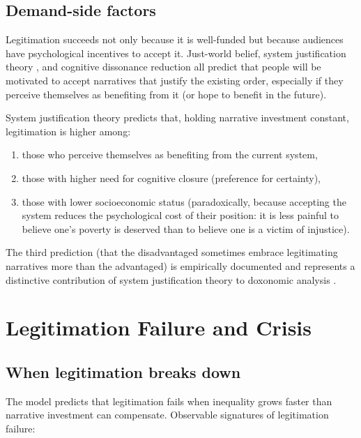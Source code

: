 \subsection{Demand-side factors}

Legitimation succeeds not only because it is well-funded but because audiences have psychological incentives to accept it.
Just-world belief, system justification theory \autocite{jost2004}, and cognitive dissonance reduction all predict that people will be motivated to accept narratives that justify the existing order, especially if they perceive themselves as benefiting from it (or hope to benefit in the future).

\begin{proposition}
\label{prop:system-justification}
System justification theory predicts that, holding narrative investment constant, legitimation is higher among:
\begin{enumerate}[nosep]
  \item those who perceive themselves as benefiting from the current system,
  \item those with higher need for cognitive closure (preference for certainty),
  \item those with lower socioeconomic status (paradoxically, because accepting the system reduces the psychological cost of their position: it is less painful to believe one's poverty is deserved than to believe one is a victim of injustice).
\end{enumerate}
The third prediction (that the disadvantaged sometimes embrace legitimating narratives more than the advantaged) is empirically documented and represents a distinctive contribution of system justification theory to doxonomic analysis \autocite{jost2004}.
\end{proposition}

\section{Legitimation Failure and Crisis}
\label{sec:ch24-failure}

\subsection{When legitimation breaks down}

The model predicts that legitimation fails when inequality grows faster than narrative investment can compensate.
Observable signatures of legitimation failure:

